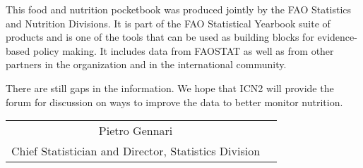 This food and nutrition pocketbook was produced jointly by the FAO Statistics and Nutrition Divisions. It is part of the FAO Statistical Yearbook suite of products and is one of the tools that can be used as building blocks for evidence-based policy making. It includes data from FAOSTAT as well as from other partners in the organization and in the international community. 

There are still gaps in the information. We hope that ICN2 will  provide the  forum for discussion on ways to improve the data to better monitor nutrition.

\bigskip

\begin{table}
\centering
\begin{tabular}{cc}
Pietro Gennari  \\
Chief Statistician and Director, Statistics Division
\end{tabular}
\end{table}
